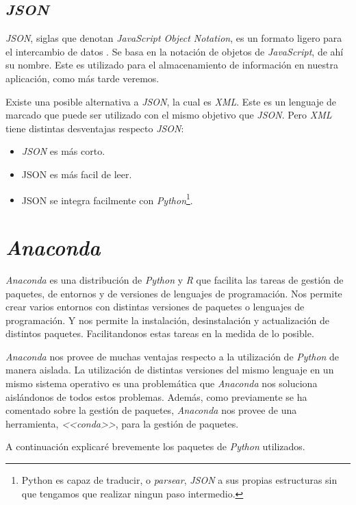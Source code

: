 \subsection{\textit{JSON}}
\textit{JSON}, siglas que denotan \textit{JavaScript Object Notation}, es un formato ligero para el intercambio de datos \cite{json}. Se basa en la notación de objetos de \textit{JavaScript}, de ahí su nombre. Este es utilizado para el almacenamiento de información en nuestra aplicación, como más tarde veremos.

Existe una posible alternativa a \textit{JSON}, la cual es \textit{XML}. Este es un lenguaje de marcado que puede ser utilizado con el mismo objetivo que \textit{JSON}. Pero \textit{XML} tiene distintas desventajas respecto \textit{JSON}:

\begin{itemize}
	\item \textit{JSON} es más corto.
	\item JSON es más facil de leer.
	\item JSON se integra facilmente con \textit{Python}\footnote{Python es capaz de traducir, o \textit{parsear}, \textit{JSON} a sus propias estructuras sin que tengamos que realizar ningun paso intermedio.}.
\end{itemize}
\section{\textit{Anaconda}}

\textit{Anaconda} es una distribución de \textit{Python} y \textit{R} que facilita las tareas de gestión de paquetes, de entornos y de versiones de lenguajes de programación. Nos permite crear varios entornos con distintas versiones de paquetes o lenguajes de programación. Y nos permite la instalación, desinstalación y actualización de distintos paquetes. Facilitandonos estas tareas en la medida de lo posible.
 
\textit{Anaconda} nos provee de muchas ventajas respecto a la utilización de \textit{Python} de manera aislada. La utilización de distintas versiones del mismo lenguaje en un mismo sistema operativo es una problemática que \textit{Anaconda} nos soluciona aislándonos de todos estos problemas. Además, como previamente se ha comentado sobre la gestión de paquetes, \textit{Anaconda} nos provee de una herramienta, \textit{<<conda>>}, para la gestión de paquetes.

A continuación explicaré brevemente los paquetes de \textit{Python} utilizados.
 
